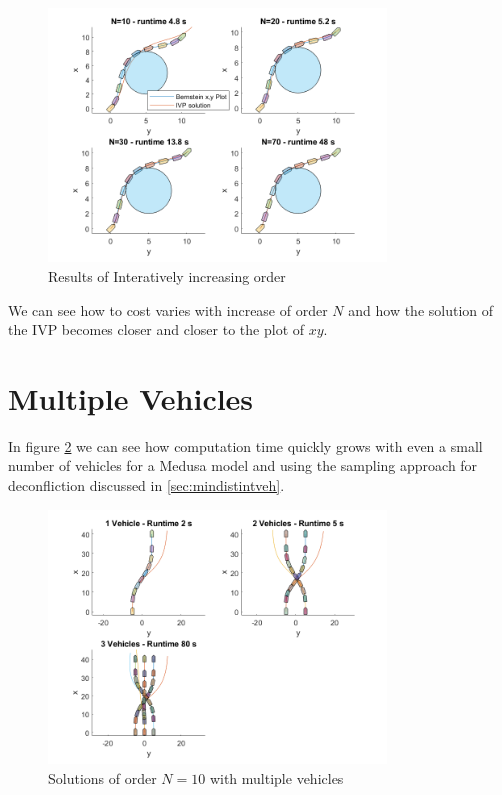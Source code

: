 \begin{figure}[h!]
\centering
\includegraphics[width=0.8\textwidth]{Images/results/progressiveNexamples.png}
\caption{Results of Interatively increasing order}
\label{fig:progressiveNexamples}
\end{figure}



\par We can see how to cost varies with increase of order $N$ and how the solution of the \ac{IVP} becomes closer and closer to the plot of $xy$.





\section{Multiple Vehicles}

\par In figure \ref{fig:multiplevehicles} we can see how computation time quickly grows with even a small number of vehicles for a Medusa model and using the sampling approach for deconfliction discussed in \ref{sec:mindistintveh}.

\begin{figure}[h!]
\centering
\includegraphics[width=0.8\textwidth]{Images/results/multiplevehicles.png}
\caption{Solutions of order $N=10$ with multiple vehicles}
\label{fig:multiplevehicles}
\end{figure}


